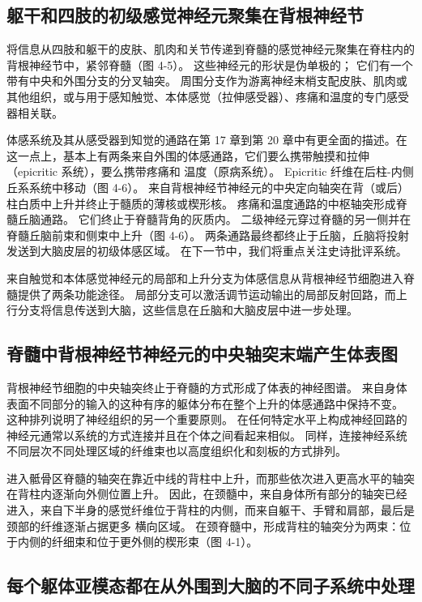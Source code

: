 \subsection{躯干和四肢的初级感觉神经元聚集在背根神经节}
将信息从四肢和躯干的皮肤、肌肉和关节传递到脊髓的感觉神经元聚集在脊柱内的背根神经节中，紧邻脊髓（图 4-5）。 这些神经元的形状是伪单极的； 它们有一个带有中央和外围分支的分叉轴突。 周围分支作为游离神经末梢支配皮肤、肌肉或其他组织，或与用于感知触觉、本体感觉（拉伸感受器）、疼痛和温度的专门感受器相关联。

体感系统及其从感受器到知觉的通路在第 17 章到第 20 章中有更全面的描述。在这一点上，基本上有两条来自外围的体感通路，它们要么携带触摸和拉伸（epicritic 系统），要么携带疼痛和 温度（原病系统）。 Epicritic 纤维在后柱-内侧丘系系统中移动（图 4-6）。 来自背根神经节神经元的中央定向轴突在背（或后）柱白质中上升并终止于髓质的薄核或楔形核。 疼痛和温度通路的中枢轴突形成脊髓丘脑通路。 它们终止于脊髓背角的灰质内。 二级神经元穿过脊髓的另一侧并在脊髓丘脑前束和侧束中上升（图 4-6）。 两条通路最终都终止于丘脑，丘脑将投射发送到大脑皮层的初级体感区域。 在下一节中，我们将重点关注史诗批评系统。

来自触觉和本体感觉神经元的局部和上升分支为体感信息从背根神经节细胞进入脊髓提供了两条功能途径。 局部分支可以激活调节运动输出的局部反射回路，而上行分支将信息传送到大脑，这些信息在丘脑和大脑皮层中进一步处理。


\subsection{脊髓中背根神经节神经元的中央轴突末端产生体表图}
背根神经节细胞的中央轴突终止于脊髓的方式形成了体表的神经图谱。 来自身体表面不同部分的输入的这种有序的躯体分布在整个上升的体感通路中保持不变。 这种排列说明了神经组织的另一个重要原则。 在任何特定水平上构成神经回路的神经元通常以系统的方式连接并且在个体之间看起来相似。 同样，连接神经系统不同层次不同处理区域的纤维束也以高度组织化和刻板的方式排列。

进入骶骨区脊髓的轴突在靠近中线的背柱中上升，而那些依次进入更高水平的轴突在背柱内逐渐向外侧位置上升。 因此，在颈髓中，来自身体所有部分的轴突已经进入，来自下半身的感觉纤维位于背柱的内侧，而来自躯干、手臂和肩部，最后是颈部的纤维逐渐占据更多 横向区域。 在颈脊髓中，形成背柱的轴突分为两束：位于内侧的纤细束和位于更外侧的楔形束（图 4-1）。


\subsection{每个躯体亚模态都在从外围到大脑的不同子系统中处理}

